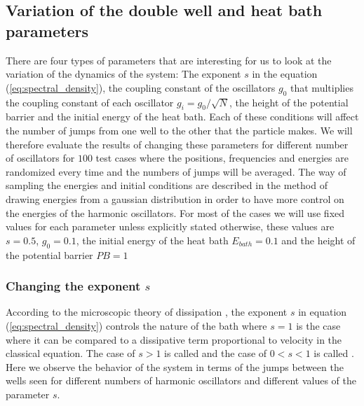 \subsection{Variation of the double well and heat bath parameters}
There are four types of parameters that are interesting for us to look at the variation of the dynamics of the system: The exponent $s$ in the  equation (\ref{eq:spectral_density}), the coupling constant of the oscillators $g_0$ that multiplies the coupling constant of each oscillator $g_i=g_0/\sqrt{N}$, the height of the potential barrier and the initial energy of the heat bath. Each of these conditions will affect the number of jumps from one well to the other that the particle makes. We will therefore evaluate the results of changing these parameters for different number of oscillators for $100$ test cases where the positions, frequencies and energies are randomized every time and the numbers of jumps will be averaged. The way of sampling the energies and initial conditions are described in the method of drawing energies from a gaussian distribution in order to have more control on the energies of the harmonic oscillators. For most of the cases we will use fixed values for each parameter unless explicitly stated otherwise, these values are $s=0.5$, $g_0=0.1$, the initial energy of the heat bath $E_{bath}=0.1$ and the height of the potential barrier $PB=1$

\subsubsection{Changing the exponent $s$}
According to the microscopic theory of dissipation \cite{leggett1987dynamics}, the exponent $s$ in equation (\ref{eq:spectral_density}) controls the nature of the bath where $s=1$ is the  case where it can be compared to a dissipative term proportional to velocity in the classical equation. The case of $s>1$ is called  and the case of $0<s<1$ is called . Here we observe the behavior of the system in terms of the jumps between the wells seen for different numbers of harmonic oscillators and different values of the parameter $s$. \par

